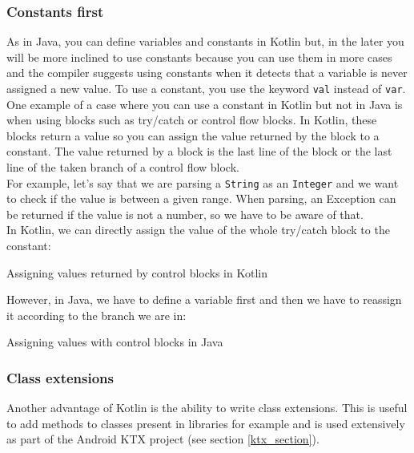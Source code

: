 \documentclass[11pt,a4paper]{report}
\newenvironment{code}{\captionsetup{type=listing}}{}
\begin{document}
\subsubsection{Constants first}
As in Java, you can define variables and constants in Kotlin but, in the later you will be more inclined to use constants because you can use them in more cases and the compiler suggests using constants when it detects that a variable is never assigned a new value. To use a constant, you use the keyword \verb+val+ instead of \verb+var+. \\

One example of a case where you can use a constant in Kotlin but not in Java is when using blocks such as try/catch or control flow blocks. In Kotlin, these blocks return a value so you can assign the value returned by the block to a constant. The value returned by a block is the last line of the block or the last line of the taken branch of a control flow block\cite{kotlin:doc:controlflow}. \\

For example, let's say that we are parsing a \verb+String+ as an \verb+Integer+ and we want to check if the value is between a given range. When parsing, an Exception can be returned if the value is not a number, so we have to be aware of that.\\

In Kotlin, we can directly assign the value of the whole try/catch block to the constant:
\begin{code}
\caption{Assigning values returned by control blocks in Kotlin}	
\end{code}

However, in Java, we have to define a variable first and then we have to reassign it according to the branch we are in:
\begin{code}
\caption{Assigning values with control blocks in Java}	
\end{code}
\subsubsection{Class extensions}
Another advantage of Kotlin is the ability to write class extensions\cite{kotlin:doc:extensions}. This is useful to add methods to classes present in libraries for example and is used extensively as part of the Android KTX project (see section \ref{ktx_section}).\\
\end{document}
